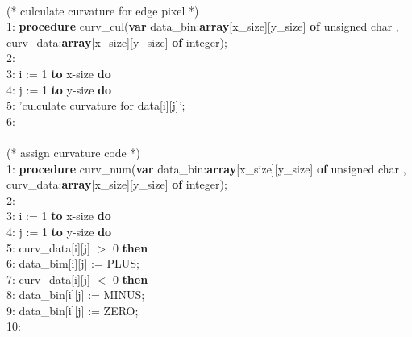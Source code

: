 \documentclass[a4paper,10pt]{jarticle}
\begin{document}
\\
(* culculate curvature for edge pixel *)\\
1: {\bfseries procedure} curv\_cul({{\bfseries var} data\_bin:{\bfseries array}[x\_size][y\_size] {\bfseries of} unsigned char , curv\_data:{\bfseries array}[x\_size][y\_size] {\bfseries of} integer);\\
2: \hspace{0cm}{\bfseries begin}\\
3: \hspace{0.5cm}{\bfseries for} i := 1 {\bfseries to} x-size {\bfseries do}\\
4: \hspace{1cm}{\bfseries for} j := 1 {\bfseries to} y-size {\bfseries do}\\
5: \hspace{1.5cm}'culculate curvature for data[i][j]';\\
6: \hspace{0cm}{\bfseries end;}\\
\\
(* assign curvature code *)\\
1: {\bfseries procedure} curv\_num({\bfseries var} data\_bin:{\bfseries array}[x\_size][y\_size] {\bfseries of} unsigned char , curv\_data:{\bfseries array}[x\_size][y\_size] {\bfseries of} integer);\\
2: \hspace{0cm}{\bfseries begin}\\
3: \hspace{0.5cm}{\bfseries for} i := 1 {\bfseries to} x-size {\bfseries do}\\
4: \hspace{1cm}{\bfseries for} j := 1 {\bfseries to} y-size {\bfseries do}\\
5: \hspace{1.5cm}{\bfseries if} curv\_data[i][j] $>$ 0 {\bfseries then}\\
6: \hspace{2cm}data\_bim[i][j] := PLUS;\\
7: \hspace{1.5cm}{\bfseries else if} curv\_data[i][j] $<$ 0 {\bfseries then}\\
8: \hspace{2cm}data\_bin[i][j] := MINUS;\\
9: \hspace{1.5cm}{\bfseries else} data\_bin[i][j] := ZERO;\\
10: \hspace{0cm}{\bfseries end;}\\
}
\end{document}
